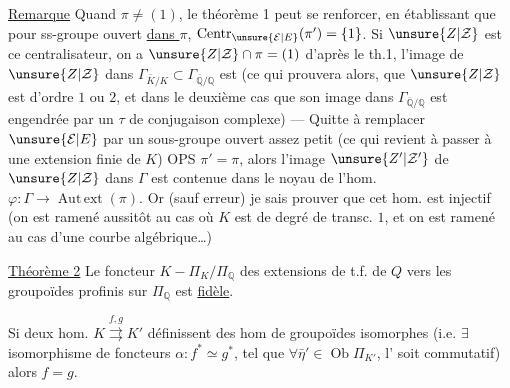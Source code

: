 \uline{Remarque} Quand $\pi\neq(1)$,  le théorème 1 peut se renforcer,  en établissant que pour  ss-groupe  ouvert \uline{dans $\pi$}, $\operatorname{Centr}_{\unsure{\mathcal E|E}}(\pi')=\{1\}$. Si $\unsure{Z|\mathcal Z}$ est ce centralisateur, on a $\unsure{Z|\mathcal Z}\cap\pi=(1)$ d'après le th.1,  l'image de $\unsure{Z|\mathcal Z}$ dans $\Gamma_{\bar K/K}\subset\Gamma_{\overline{\mathbb Q}/\mathbb Q}$ est  (ce qui prouvera  alors, que $\unsure{Z|\mathcal Z}$ est d'ordre $1$ ou $2$, et dans le deuxième cas que son image dans $\Gamma_{\overline{\mathbb Q}/\mathbb Q}$ est  engendrée par un $\tau$ de conjugaison complexe) --- Quitte à remplacer $\unsure{\mathcal E|E}$ par un sous-groupe ouvert assez petit (ce qui revient à passer à une extension finie de $K$) OPS $\pi'=\pi$, alors l'image $\unsure{Z'|\mathcal Z'}$ de $\unsure{Z|\mathcal Z}$ dans $\Gamma$ est contenue dans le noyau de l'hom. $\varphi:\Gamma\longrightarrow\operatorname{Aut\,ext}(\pi)$. Or (sauf erreur) je sais prouver que cet hom. est injectif (on est ramené aussitôt au cas où $K$ est de degré de transc. $1$, et on est ramené au cas  d'une courbe algébrique\ldots)

\uline{Théorème 2} Le foncteur $K-\Pi_K/\Pi_{\mathbb Q}$ des extensions de t.f. de $Q$ vers les groupoïdes profinis sur $\Pi_{\mathbb Q}$ est \uline{fidèle}.


Si deux hom. $K\overset{f,g}{\rightrightarrows}K'$ définissent des hom de groupoïdes  isomorphes
(i.e. $\exists$ isomorphisme de foncteurs $\alpha:f^*\simeq g^*$, tel que $\forall\bar\eta'\in\operatorname{Ob}\Pi_{K'}$, l'
soit commutatif) alors $f=g$.

